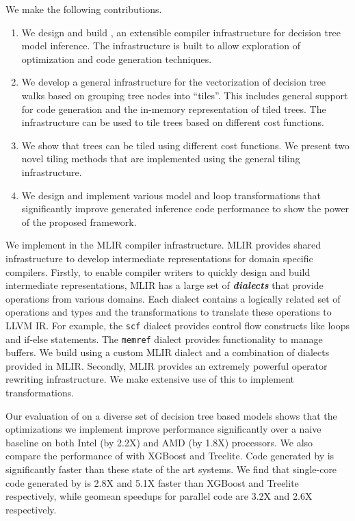We make the following contributions.
\begin{enumerate}
  \item We design and build \Treebeard{}, an extensible compiler infrastructure for decision tree model inference. The 
  infrastructure is built to allow exploration of optimization and code generation techniques. %
  \item We develop a general infrastructure for the vectorization of decision tree walks based on grouping tree nodes into ``tiles''.
   This includes general support for code generation and the in-memory representation of tiled trees. The infrastructure can be 
   used to tile trees based on different cost functions.
  \item We show that trees can be tiled using different cost functions. We present two novel tiling methods that are implemented
  using the general tiling infrastructure. 
  \item We design and implement various model and loop transformations that significantly improve generated inference code performance 
  to show the power of the proposed framework.
\end{enumerate}

We implement \Treebeard{} in the MLIR compiler infrastructure\cite{MLIR}. MLIR provides shared infrastructure
to develop intermediate representations for domain specific compilers. Firstly, to enable compiler writers to 
quickly design and build intermediate representations, MLIR has a large set of 
\textbf{\emph{dialects}} that provide operations from various domains. Each dialect 
contains a logically related set of operations and types and the transformations to translate these operations to LLVM IR. 
For example, the \texttt{scf} dialect provides control flow constructs like loops and if-else statements. 
The \texttt{memref} dialect provides functionality to manage buffers. We build \Treebeard{} using a custom
MLIR dialect and a combination of dialects provided in MLIR. Secondly, MLIR provides an extremely powerful 
operator rewriting infrastructure. We make extensive use of this to implement transformations.

Our evaluation of \Treebeard{} on a diverse set of decision tree based models shows that 
the optimizations we implement improve performance significantly over a naive baseline 
on both Intel (by 2.2X) and AMD (by 1.8X) processors. We also compare the performance of \Treebeard{}
with XGBoost and Treelite. Code generated by \Treebeard{} is significantly faster than 
these state of the art systems. We find that single-core code generated by \Treebeard{} is 
2.8X and 5.1X faster than XGBoost and Treelite respectively, while geomean speedups for parallel code are
3.2X and 2.6X respectively.


